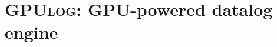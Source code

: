 \documentclass[nonacm,sigplan]{acmart}
\newcommand{\tool}{\textsc{GPUlog}}
\begin{document}



\section{\tool{}: GPU-powered datalog engine}
\label{sec:gdlog}
\end{document}
